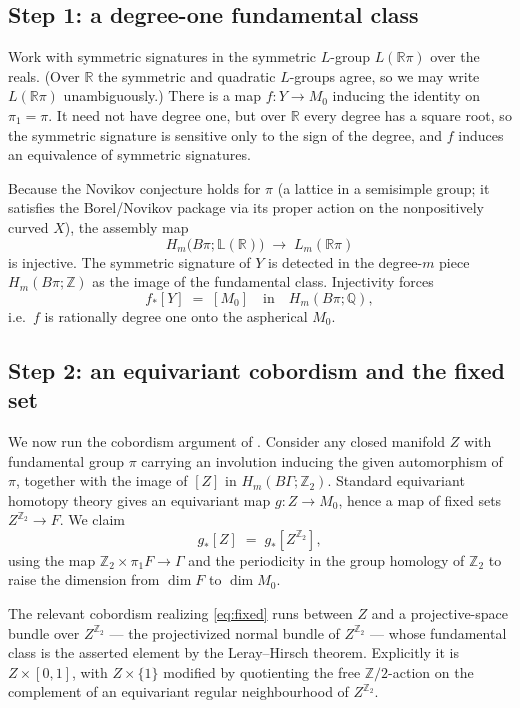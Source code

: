 \documentclass[11pt]{article}
\newcommand{\R}{\mathbb{R}}
\newcommand{\Q}{\mathbb{Q}}
\newcommand{\Z}{\mathbb{Z}}
\newcommand{\Lgp}{\mathbb{L}}
\begin{document}
\subsection*{Step 1: a degree-one fundamental class}

Work with symmetric signatures in the symmetric $L$-group $L(\R\pi)$ over the
reals. (Over $\R$ the symmetric and quadratic $L$-groups agree, so we may write
$L(\R\pi)$ unambiguously.) There is a map $f:Y\to M_0$ inducing the identity on
$\pi_1=\pi$. It need not have degree one, but over $\R$ every degree has a square
root, so the symmetric signature is sensitive only to the sign of the degree,
and $f$ induces an equivalence of symmetric signatures.

Because the Novikov conjecture holds for $\pi$ (a lattice in a semisimple group;
it satisfies the Borel/Novikov package via its proper action on the
nonpositively curved $X$), the assembly map
\[
  H_m\bigl(B\pi;\Lgp(\R)\bigr)\;\longrightarrow\;L_m(\R\pi)
\]
is injective. The symmetric signature of $Y$ is detected in the degree-$m$ piece
$H_m(B\pi;\Z)$ as the image of the fundamental class. Injectivity forces
\begin{equation}\label{eq:deg-one}
  f_*[Y]\;=\;[M_0]\quad\text{in}\quad H_m(B\pi;\Q),
\end{equation}
i.e.\ $f$ is rationally degree one onto the aspherical $M_0$.

\subsection*{Step 2: an equivariant cobordism and the fixed set}

We now run the cobordism argument of \cite{W1}. Consider any closed manifold $Z$
with fundamental group $\pi$ carrying an involution inducing the given
automorphism of $\pi$, together with the image of $[Z]$ in $H_m(B\Gamma;\Z_2)$.
Standard equivariant homotopy theory gives an equivariant map $g:Z\to M_0$,
hence a map of fixed sets $Z^{\Z_2}\to F$. We claim
\begin{equation}\label{eq:fixed}
  g_*[Z]\;=\;g_*[Z^{\Z_2}],
\end{equation}
using the map $\Z_2\times\pi_1F\to\Gamma$ and the periodicity in the group
homology of $\Z_2$ to raise the dimension from $\dim F$ to $\dim M_0$.

The relevant cobordism realizing \eqref{eq:fixed} runs between $Z$ and a
projective-space bundle over $Z^{\Z_2}$ --- the projectivized normal bundle of
$Z^{\Z_2}$ --- whose fundamental class is the asserted element by the
Leray--Hirsch theorem. Explicitly it is $Z\times[0,1]$, with $Z\times\{1\}$
modified by quotienting the free $\Z/2$-action on the complement of an
equivariant regular neighbourhood of $Z^{\Z_2}$.
\end{document}
